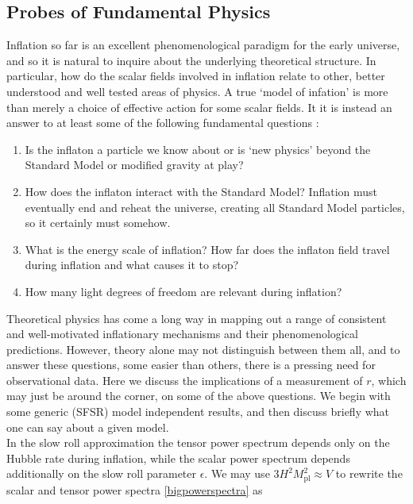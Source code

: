 \documentclass[a4paper,10pt]{article}
\newcommand{\Mp}{M_{\text{pl}}}
\begin{document}
\subsection{Probes of Fundamental Physics}

Inflation so far is an excellent phenomenological paradigm for the early universe, and so it is natural to inquire about the underlying theoretical structure. In particular, how do the scalar fields involved in inflation relate to other, better understood and well tested areas of physics. A true `model of infation' is more than merely a choice of  effective action for some scalar fields. It it is instead an answer to at least some of the following fundamental questions \cite{CMBPol}:

\begin{enumerate}
\item Is the inflaton a particle we know about or is `new physics' beyond the Standard Model or modified gravity at play?
\item How does the inflaton interact with the Standard Model? Inflation must eventually end and reheat the universe, creating all Standard Model particles, so it certainly must somehow.
\item What is the energy scale of inflation? How far does the inflaton field travel during inflation and what causes it to stop?
\item How many light degrees of freedom are relevant during inflation? 
\end{enumerate}

Theoretical physics has come a long way in mapping out a range of consistent and well-motivated inflationary mechanisms and their phenomenological predictions. However, theory alone may not distinguish between them all, and to answer these questions, some easier than others, there is a pressing need for observational data. Here we discuss the implications of a measurement of $r$, which may just be around the corner, on some of the above questions. We begin with some generic (SFSR) model independent results, and then discuss briefly what one can say about a given model.\\

In the slow roll approximation the tensor power spectrum depends only on the Hubble rate during inflation, while the scalar power spectrum depends additionally on the slow roll parameter $\epsilon$. We may use $3H^2\Mp^2\approx V$ to rewrite the scalar and tensor power spectra \ref{bigpowerspectra} as
\end{document}
